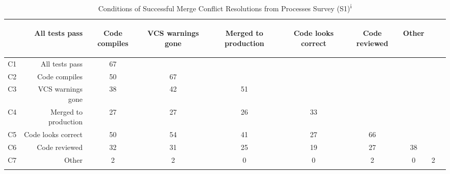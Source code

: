 \begin{table}[!htbp]
\caption{Conditions of Successful Merge Conflict Resolutions from Processes Survey (S1)\textsuperscript{i}}
\label{conditionsSuccess}
\centering
\begin{tabularx}{\textwidth}{@{}lr|*{7}{C}c@{}}
\toprule
\addlinespace[4.9em]
	& \begin{rotate}{30} All tests pass \end{rotate}
	& \begin{rotate}{30} Code compiles \end{rotate}
	& \begin{rotate}{30} VCS warnings gone \end{rotate}
	& \begin{rotate}{30} Merged to production \end{rotate}
	& \begin{rotate}{30} Code looks correct \end{rotate}
	& \begin{rotate}{30} Code reviewed \end{rotate}
	& \begin{rotate}{30} Other \end{rotate} \\
\midrule
	C1 & All tests pass & 67 & & & & & & \\
	C2 & Code compiles & 50 & 67 & & & & & \\
	C3 & VCS warnings gone & 38 & 42 & 51 & & & & \\
	C4 & Merged to production & 27 & 27 & 26 & 33 & & & \\
	C5 & Code looks correct & 50 & 54 & 41 & 27 & 66 & & \\
	C6 & Code reviewed & 32 & 31 & 25 & 19 & 27 & 38 & \\
	C7 & Other & 2 & 2 & 0 & 0 & 2 & 0 & 2 \\
\bottomrule
     \\
\end{tabularx}
\end{table}

